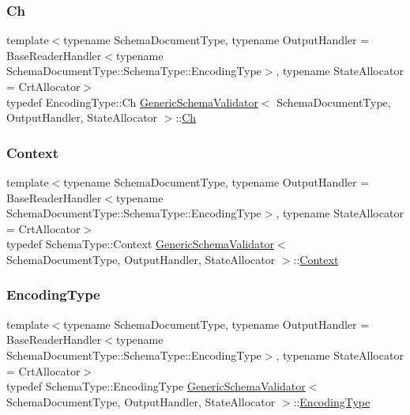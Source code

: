 \subsubsection{\texorpdfstring{Ch}{Ch}}
{\footnotesize\ttfamily template$<$typename Schema\+Document\+Type, typename Output\+Handler = Base\+Reader\+Handler$<$typename Schema\+Document\+Type\+::\+Schema\+Type\+::\+Encoding\+Type$>$, typename State\+Allocator = Crt\+Allocator$>$ \\
typedef Encoding\+Type\+::\+Ch \hyperlink{classGenericSchemaValidator}{Generic\+Schema\+Validator}$<$ Schema\+Document\+Type, Output\+Handler, State\+Allocator $>$\+::\hyperlink{classGenericSchemaValidator_a8b7dab5a0cda9cc0adaefb4401d260c1}{Ch}}

\mbox{\label{classGenericSchemaValidator_ac6403619afb8aa8729e1e15d8c34d350}} 
\subsubsection{\texorpdfstring{Context}{Context}}
{\footnotesize\ttfamily template$<$typename Schema\+Document\+Type, typename Output\+Handler = Base\+Reader\+Handler$<$typename Schema\+Document\+Type\+::\+Schema\+Type\+::\+Encoding\+Type$>$, typename State\+Allocator = Crt\+Allocator$>$ \\
typedef Schema\+Type\+::\+Context \hyperlink{classGenericSchemaValidator}{Generic\+Schema\+Validator}$<$ Schema\+Document\+Type, Output\+Handler, State\+Allocator $>$\+::\hyperlink{classGenericSchemaValidator_ac6403619afb8aa8729e1e15d8c34d350}{Context}\hspace{0.3cm}{\ttfamily [private]}}

\mbox{\label{classGenericSchemaValidator_acf1c5361bb96da87d23167d8720b1ea5}} 
\subsubsection{\texorpdfstring{Encoding\+Type}{EncodingType}}
{\footnotesize\ttfamily template$<$typename Schema\+Document\+Type, typename Output\+Handler = Base\+Reader\+Handler$<$typename Schema\+Document\+Type\+::\+Schema\+Type\+::\+Encoding\+Type$>$, typename State\+Allocator = Crt\+Allocator$>$ \\
typedef Schema\+Type\+::\+Encoding\+Type \hyperlink{classGenericSchemaValidator}{Generic\+Schema\+Validator}$<$ Schema\+Document\+Type, Output\+Handler, State\+Allocator $>$\+::\hyperlink{classGenericSchemaValidator_acf1c5361bb96da87d23167d8720b1ea5}{Encoding\+Type}}

